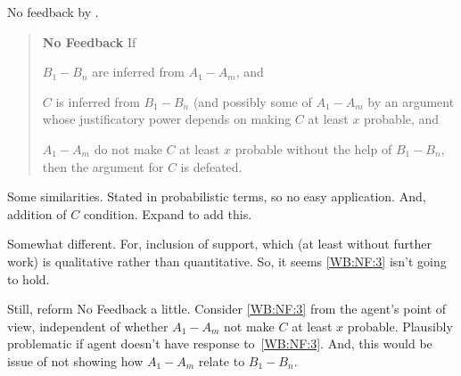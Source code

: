 \begin{note}
  No feedback by \citeauthor{Weisberg:2010to}.

  \begin{quote}
    \textbf{No Feedback} If
    \begin{enumerate*}[label=(\roman*), ref=(\roman*)]
    \item\label{WB:NF:1} \(B_{1}-B_{n}\) are inferred from \(A_{1}-A_{m}\), and
    \item\label{WB:NF:2} \(C\) is inferred from \(B_{1}-B_{n}\) (and possibly some of \(A_{1}-A_{m}\) by an argument whose justificatory power depends on making \(C\) at least \(x\) probable, and
    \item\label{WB:NF:3} \(A_{1}-A_{m}\) do not make \(C\) at least \(x\) probable without the help of \(B_{1}-B_{n}\), then the argument for \(C\) is defeated.
    \end{enumerate*}
  \end{quote}

  Some similarities.
  Stated in probabilistic terms, so no easy application.
  And, addition of \(C\) condition.
  Expand to add this.

  Somewhat different.
  For, inclusion of support, which (at least without further work) is qualitative rather than quantitative.
  So, it seems \ref{WB:NF:3} isn't going to hold.

  Still, reform No Feedback a little.
  Consider \ref{WB:NF:3} from the agent's point of view, independent of whether \(A_{1}-A_{m}\) not make \(C\) at least \(x\) probable.
  Plausibly problematic if agent doesn't have response to~\ref{WB:NF:3}.
  And, this would be issue of not showing how \(A_{1}-A_{m}\) relate to \(B_{1}-B_{n}\).
\end{note}

